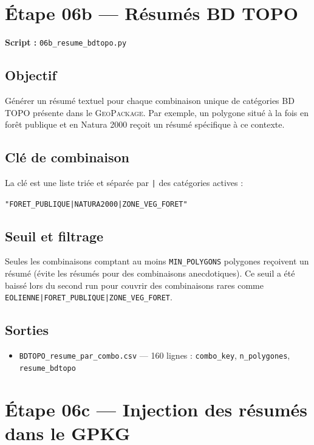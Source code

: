 \documentclass[12pt,a4paper]{report}
\newcommand{\code}[1]{\texttt{\small #1}}
\newcommand{\gpkg}{\textsc{GeoPackage}}
\newcommand{\bdtopo}{\textsc{BD TOPO}}
\begin{document}
\section{Étape 06b — Résumés BD TOPO}

\textbf{Script :} \code{06b\_resume\_bdtopo.py}

\subsection{Objectif}

Générer un résumé textuel pour chaque combinaison unique de catégories \bdtopo{} présente dans le \gpkg{}. Par exemple, un polygone situé à la fois en forêt publique et en Natura 2000 reçoit un résumé spécifique à ce contexte.

\subsection{Clé de combinaison}

La clé est une liste triée et séparée par \code{|} des catégories actives :
\begin{center}
\code{"FORET\_PUBLIQUE|NATURA2000|ZONE\_VEG\_FORET"}
\end{center}

\subsection{Seuil et filtrage}

Seules les combinaisons comptant au moins \code{MIN\_POLYGONS} polygones reçoivent un résumé (évite les résumés pour des combinaisons anecdotiques). Ce seuil a été baissé lors du second run pour couvrir des combinaisons rares comme \code{EOLIENNE|FORET\_PUBLIQUE|ZONE\_VEG\_FORET}.

\subsection{Sorties}

\begin{itemize}
  \item \code{BDTOPO\_resume\_par\_combo.csv} — 160 lignes : \code{combo\_key}, \code{n\_polygones}, \code{resume\_bdtopo}
\end{itemize}

\section{Étape 06c — Injection des résumés dans le GPKG}
\end{document}
